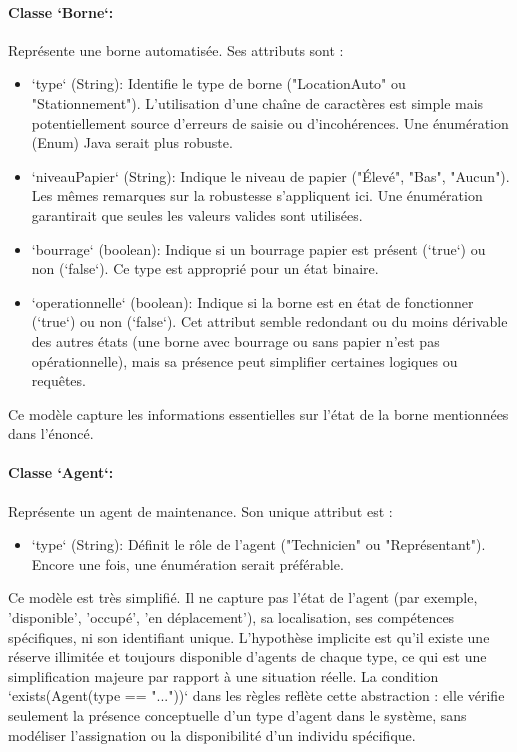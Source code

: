 \documentclass[11pt,a4paper]{article}
\begin{document}
\paragraph{Classe `Borne`:} Représente une borne automatisée. Ses attributs sont :
\begin{itemize}
    \item `type` (String): Identifie le type de borne ("LocationAuto" ou "Stationnement"). L'utilisation d'une chaîne de caractères est simple mais potentiellement source d'erreurs de saisie ou d'incohérences. Une énumération (Enum) Java serait plus robuste.
    \item `niveauPapier` (String): Indique le niveau de papier ("Élevé", "Bas", "Aucun"). Les mêmes remarques sur la robustesse s'appliquent ici. Une énumération garantirait que seules les valeurs valides sont utilisées.
    \item `bourrage` (boolean): Indique si un bourrage papier est présent (`true`) ou non (`false`). Ce type est approprié pour un état binaire.
    \item `operationnelle` (boolean): Indique si la borne est en état de fonctionner (`true`) ou non (`false`). Cet attribut semble redondant ou du moins dérivable des autres états (une borne avec bourrage ou sans papier n'est pas opérationnelle), mais sa présence peut simplifier certaines logiques ou requêtes.
\end{itemize}
Ce modèle capture les informations essentielles sur l'état de la borne mentionnées dans l'énoncé.

\paragraph{Classe `Agent`:} Représente un agent de maintenance. Son unique attribut est :
\begin{itemize}
    \item `type` (String): Définit le rôle de l'agent ("Technicien" ou "Représentant"). Encore une fois, une énumération serait préférable.
\end{itemize}
Ce modèle est très simplifié. Il ne capture pas l'état de l'agent (par exemple, 'disponible', 'occupé', 'en déplacement'), sa localisation, ses compétences spécifiques, ni son identifiant unique. L'hypothèse implicite est qu'il existe une réserve illimitée et toujours disponible d'agents de chaque type, ce qui est une simplification majeure par rapport à une situation réelle. La condition `exists(Agent(type == "..."))` dans les règles reflète cette abstraction : elle vérifie seulement la présence conceptuelle d'un type d'agent dans le système, sans modéliser l'assignation ou la disponibilité d'un individu spécifique.
\end{document}
